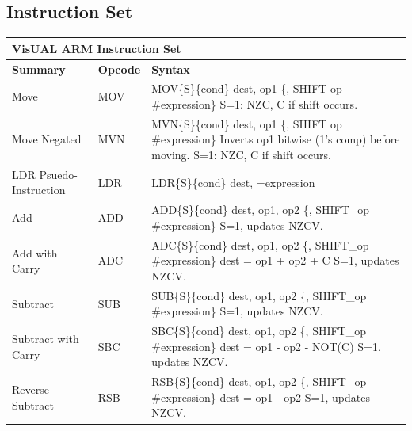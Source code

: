 \documentclass[../comorg-part1.tex]{subfiles}
\begin{document}
\begin{landscape}

\subsection{Instruction Set}

\small 
\renewcommand{\arraystretch}{1.4} 

\begin{longtable}{|p{4cm}|l|p{16cm}|}
\hline
\multicolumn{3}{|l|}{\textbf{\large VisUAL ARM Instruction Set}} \\
\hline
\rowcolor{headercyan} \textbf{Summary} & \textbf{Opcode} & \textbf{Syntax} \\
\hline
\endhead

Move & MOV & \ttfamily MOV\{S\}\{cond\} dest, op1 \{, SHIFT op \#expression\} \newline S=1: NZC, C if shift occurs. \\ \hline
Move Negated & MVN & \ttfamily MVN\{S\}\{cond\} dest, op1 \{, SHIFT op \#expression\} \newline Inverts op1 bitwise (1's comp) before moving. \newline S=1: NZC, C if shift occurs. \\ \hline
LDR Psuedo-Instruction & LDR & \ttfamily LDR\{S\}\{cond\} dest, =expression \\ \hline
Add & ADD & \ttfamily ADD\{S\}\{cond\} dest, op1, op2 \{, SHIFT\_op \#expression\} \newline S=1, updates NZCV. \\ \hline
Add with Carry & ADC & \ttfamily ADC\{S\}\{cond\} dest, op1, op2 \{, SHIFT\_op \#expression\} \newline dest = op1 + op2 + C \newline S=1, updates NZCV. \\ \hline
Subtract & SUB & \ttfamily SUB\{S\}\{cond\} dest, op1, op2 \{, SHIFT\_op \#expression\} \newline S=1, updates NZCV. \\ \hline
Subtract with Carry & SBC & \ttfamily SBC\{S\}\{cond\} dest, op1, op2 \{, SHIFT\_op \#expression\} \newline dest = op1 - op2 - NOT(C) \newline S=1, updates NZCV. \\ \hline
Reverse Subtract & RSB & \ttfamily RSB\{S\}\{cond\} dest, op1, op2 \{, SHIFT\_op \#expression\} \newline dest = op1 - op2 \newline S=1, updates NZCV. \\ \hline

\end{longtable}
\end{landscape}
\end{document}
